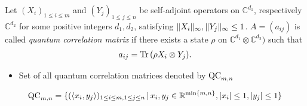\begin{frame}
	\begin{definition}
		Let $ (X_i)_{1 \le i \le m } $ and $ (Y_j)_{1 \le j \le n} $ be self-adjoint operators on $ \mathbb{C}^{d_1} $, respectively $ \mathbb{C}^{d_2} $ for some positive integers $ d_1,d_2 $, satisfying $  \Vert {X_i} \Vert_{\infty},  \Vert {Y_j} \Vert_{\infty} \le 1 $. $ A = (a_{ij}) $ is called {\itshape quantum correlation matrix} if there exists a state $ \rho $ on $\mathbb{C}^{d_1} \otimes \mathbb{C}^{d_2})$ such that 
		\begin{align*}\label{QCaij}
		a_{ij} = \textup{Tr} \, {(\rho X_i \otimes Y_j)} .
		\end{align*}
	\end{definition}
	\pause
	\begin{itemize}
		\item Set of all quantum correlation matrices denoted by $ \textup{QC}_{m,n} $
		\pause
	\end{itemize}
	\begin{lemma}
		\begin{align*}
		\textup{QC}_{m,n} = \{ (\langle x_i,y_j \rangle)_{1 \le i \le m, 1 \le j \le n} \,| \, x_i,y_j \in \mathbb{R}^{ \min \{m,n \} }, \vert x_i  \vert \le 1, \vert y_j \vert \le 1  \}
		\end{align*}
	\end{lemma}
\end{frame}

